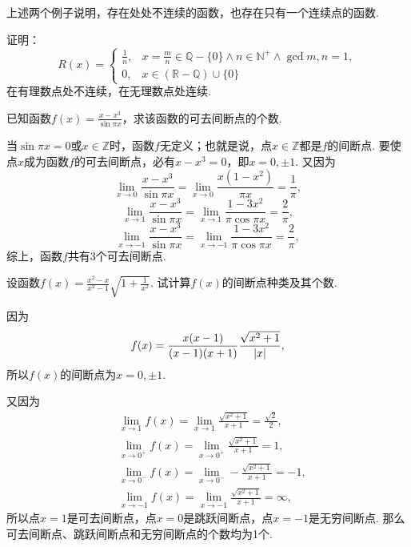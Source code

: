 上述两个例子说明，存在处处不连续的函数，也存在只有一个连续点的函数.

\begin{example}
证明：\[
	R(x) = \left\{ \begin{array}{cl}
		\frac{1}{n},
			& x=\frac{m}{n}\in\mathbb{Q}-\{0\}
				\land n\in\mathbb{N}^+
				\land \gcd{m,n}=1, \\
		0, & x\in(\mathbb{R}-\mathbb{Q})\cup\{0\}
	\end{array} \right.
\]在有理数点处不连续，在无理数点处连续.
\end{example}

\begin{example}
已知函数\(f(x) = \frac{x-x^3}{\sin \pi x}\)，求该函数的可去间断点的个数.
\begin{solution}
当\(\sin \pi x = 0\)或\(x \in \mathbb{Z}\)时，函数\(f\)无定义；也就是说，点\(x\in\mathbb{Z}\)都是\(f\)的间断点.
要使点\(x\)成为函数\(f\)的可去间断点，必有\(x-x^3=0\)，即\(x=0,\pm1\).
\def\l#1{\lim\limits_{x\to#1}}%
又因为\[
\l{0} \frac{x-x^3}{\sin \pi x}
= \l{0} \frac{x(1-x^2)}{\pi x}
= \frac{1}{\pi},
\]\[
\l{1} \frac{x-x^3}{\sin \pi x}
= \l{1} \frac{1-3x^2}{\pi \cos \pi x}
= \frac{2}{\pi},
\]\[
\l{-1} \frac{x-x^3}{\sin \pi x}
= \l{-1} \frac{1-3x^2}{\pi \cos \pi x}
= \frac{2}{\pi},
\]综上，函数\(f\)共有3个可去间断点.
\end{solution}
\end{example}

\begin{example}
设函数\(f(x) = \frac{x^2-x}{x^2-1}\sqrt{1+\frac{1}{x^2}}\).
试计算\(f(x)\)的间断点种类及其个数.
\begin{solution}
因为\[
f(x) = \frac{x(x-1)}{(x-1)(x+1)} \frac{\sqrt{x^2+1}}{\abs{x}},
\]所以\(f(x)\)的间断点为\(x=0,\pm1\).

又因为\begin{align*}
&\lim\limits_{x\to1} f(x)
= \lim\limits_{x\to1} \frac{\sqrt{x^2+1}}{x+1}
= \frac{\sqrt{2}}{2}, \\
&\lim\limits_{x\to0^+} f(x)
= \lim\limits_{x\to0^+} \frac{\sqrt{x^2+1}}{x+1}
= 1, \\
&\lim\limits_{x\to0^-} f(x)
= \lim\limits_{x\to0^-} -\frac{\sqrt{x^2+1}}{x+1}
= -1, \\
&\lim\limits_{x\to-1} f(x)
= \lim\limits_{x\to-1} \frac{\sqrt{x^2+1}}{x+1}
= \infty,
\end{align*}
所以点\(x=1\)是可去间断点，点\(x=0\)是跳跃间断点，点\(x=-1\)是无穷间断点.
那么可去间断点、跳跃间断点和无穷间断点的个数均为1个.
\end{solution}
\end{example}

